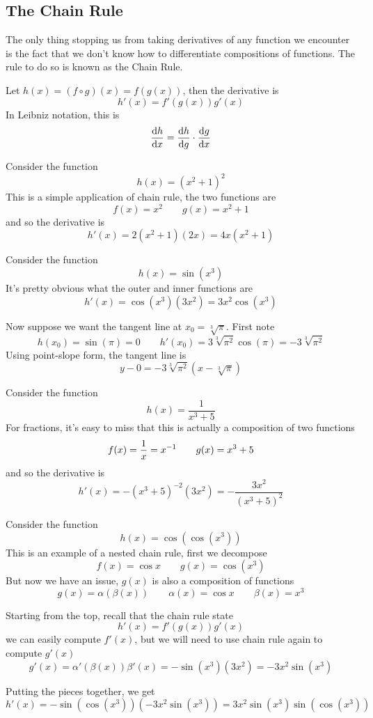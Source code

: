 \newpage
\subsection{The Chain Rule}
The only thing stopping us from taking derivatives of any function we encounter is the fact that we don't know how to differentiate compositions of functions. The rule to do so is known as the Chain Rule.

\begin{theorem}
	Let $h(x) = (f \circ g)(x) = f(g(x))$, then the derivative is 
	\[ h'(x) = f'(g(x)) g'(x) \]
	In Leibniz notation, this is
	\[ \dv{h}{x} = \dv{h}{g} \cdot \dv{g}{x} \]
\end{theorem}

\begin{example}
	Consider the function
	\[ h(x) = (x^2 + 1)^2 \]
	This is a simple application of chain rule, the two functions are
	\[ f(x) = x^2 \qquad g(x) = x^2 + 1 \]
	and so the derivative is 
	\[ h'(x) = 2(x^2 + 1)(2x) = 4x(x^2 + 1) \]
\end{example}

\begin{example}
	Consider the function
	\[ h(x) = \sin(x^3) \]
	It's pretty obvious what the outer and inner functions are
	\[ h'(x) = \cos(x^3)(3x^2) = 3x^2 \cos(x^3) \]
	
	Now suppose we want the tangent line at $x_0 = \sqrt[3]{\pi}$. First note
	\[ h(x_0) = \sin(\pi) = 0 \qquad h'(x_0) = 3\sqrt[3]{\pi^2}\cos(\pi) = -3\sqrt[3]{\pi^2} \]
	Using point-slope form, the tangent line is
	\[ y - 0 = -3\sqrt[3]{\pi^2}(x - \sqrt[3]{\pi}) \]
\end{example}

\begin{example}
	Consider the function
	\[ h(x) = \frac{1}{x^3 + 5} \]
	For fractions, it's easy to miss that this is actually a composition of two functions
	\[ f(x) = \frac{1}{x} = {x}^{-1} \qquad g(x) = x^3 + 5 \]
	and so the derivative is
	\[ h'(x) = -(x^3 + 5)^{-2}(3x^2) = -\frac{3x^2}{(x^3 + 5)^2}\]
\end{example}

\begin{example}
	Consider the function
	\[ h(x) = \cos(\cos(x^3)) \]
	This is an example of a nested chain rule, first we decompose
	\[ f(x) = \cos x \qquad g(x) = \cos(x^3) \]
	But now we have an issue, $g(x)$ is also a composition of functions
	\[ g(x) = \alpha(\beta(x)) \qquad \alpha(x) = \cos x \qquad \beta(x) = x^3 \]
	
	Starting from the top, recall that the chain rule state
	\[ h'(x) = f'(g(x)) g'(x) \]
	we can easily compute $f'(x)$, but we will need to use chain rule again to compute $g'(x)$
	\[ g'(x) = \alpha'(\beta(x)) \beta'(x) = -\sin(x^3) (3x^2) = -3x^2 \sin(x^3) \]
	
	Putting the pieces together, we get
	\[ h'(x) = -\sin( \cos(x^3)) (-3x^2 \sin(x^3)) = 3x^2 \sin(x^3) \sin(\cos(x^3)) \]
\end{example}


